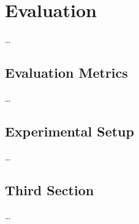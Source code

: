 
\chapter{Evaluation}
\label{ch:Evaluation}

\dots

\section{Evaluation Metrics}
\label{sec:Evaluation:Metrics}

\dots

\section{Experimental Setup}
\label{sec:Evaluation:Setup}

\dots


\section{Third Section}
\label{sec:Evaluation:ThirdSection}

\dots
